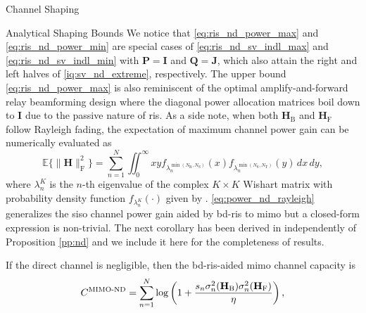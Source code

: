 \documentclass[journal]{IEEEtran}
\begin{document}
\begin{section}{Channel Shaping}
\begin{subsection}{Analytical Shaping Bounds}
		We notice that \eqref{eq:ris_nd_power_max} and \eqref{eq:ris_nd_power_min} are special cases of \eqref{eq:ris_nd_sv_indl_max} and \eqref{eq:ris_nd_sv_indl_min} with $\mathbf{P} = \mathbf{I}$ and $\mathbf{Q} = \mathbf{J}$, which also attain the right and left halves of \eqref{iq:sv_nd_extreme}, respectively.
		The upper bound \eqref{eq:ris_nd_power_max} is also reminiscent of the optimal amplify-and-forward relay beamforming design \cite[(16), (17)]{Rong2009a} where the diagonal power allocation matrices boil down to $\mathbf{I}$ due to the passive nature of \gls{ris}.
		As a side note, when both $\mathbf{H}_\mathrm{B}$ and $\mathbf{H}_\mathrm{F}$ follow Rayleigh fading, the expectation of maximum channel power gain can be numerically evaluated as
		\begin{equation}
			\label{eq:power_nd_rayleigh}
			\mathbb{E}\bigl\{ \lVert \mathbf{H} \rVert _ \mathrm{F}^2 \bigr\} =
			\sum_{n=1}^N \iint_0^\infty xy
			f_{\lambda_n^{\min(N_\mathrm{R},N_\mathrm{S})}}(x)
			f_{\lambda_n^{\min(N_\mathrm{S},N_\mathrm{T})}}(y) \, dx \, dy,
		\end{equation}
		where $\lambda_n^{K}$ is the $n$-th eigenvalue of the complex $K \times K$ Wishart matrix with probability density function $f_{\lambda_n^{K}}(\cdot)$ given by \cite[(51)]{Zanella2009}.
		\eqref{eq:power_nd_rayleigh} generalizes the \gls{siso} channel power gain aided by \gls{bd}-\gls{ris} \cite[(58)]{Shen2020a} to \gls{mimo} but a closed-form expression is non-trivial.
		The next corollary has been derived in \cite{Bartoli2023} independently of Proposition \ref{pp:nd} and we include it here for the completeness of results.
		\begin{corollary}
			\label{co:nd_capacity_snr_general}
			If the direct channel is negligible, then the \gls{bd}-\gls{ris}-aided \gls{mimo} channel capacity is
			\begin{equation}
				\label{eq:capacity_nd}
				C^\textnormal{MIMO-ND} = \sum_{n=1}^N \log \left(1 + \frac{s_n \sigma_n^2(\mathbf{H}_\mathrm{B}) \sigma_n^2(\mathbf{H}_\mathrm{F})}{\eta}\right),

\end{equation}
\end{corollary}
\end{subsection}
\end{section}
\end{document}
